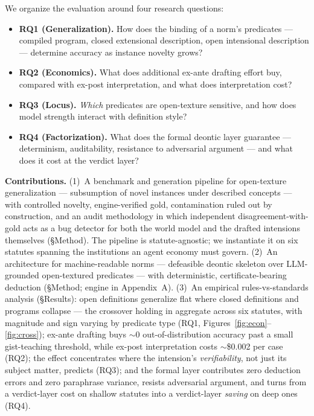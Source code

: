 We organize the evaluation around four research questions:

\begin{itemize}
\item \textbf{RQ1 (Generalization).} How does the binding of a norm's
  predicates --- compiled program, closed extensional description, open
  intensional description --- determine accuracy as instance novelty grows?
\item \textbf{RQ2 (Economics).} What does additional ex-ante drafting effort
  buy, compared with ex-post interpretation, and what does interpretation
  cost?
\item \textbf{RQ3 (Locus).} \emph{Which} predicates are open-texture
  sensitive, and how does model strength interact with definition style?
\item \textbf{RQ4 (Factorization).} What does the formal deontic layer
  guarantee --- determinism, auditability, resistance to adversarial
  argument --- and what does it cost at the verdict layer?
\end{itemize}

\noindent\textbf{Contributions.}
(1)~A benchmark and generation pipeline for open-texture generalization ---
subsumption of novel instances under described concepts --- with controlled
novelty, engine-verified gold, contamination ruled out by construction, and
an audit methodology in which independent disagreement-with-gold acts as a
bug detector for both the world model and the drafted intensions themselves
(\S Method). The pipeline is statute-agnostic; we instantiate it on six
statutes spanning the institutions an agent economy must govern.
(2)~An architecture for machine-readable norms --- defeasible deontic
skeleton over LLM-grounded open-textured predicates --- with deterministic,
certificate-bearing deduction (\S Method; engine in Appendix~A).
(3)~An empirical rules-vs-standards analysis (\S Results): open definitions
generalize flat where closed definitions and programs collapse --- the
crossover holding in aggregate across six statutes, with magnitude and sign
varying by predicate type (RQ1,
Figures~\ref{fig:econ}--\ref{fig:cross}); ex-ante
drafting buys $\sim$0 out-of-distribution accuracy past a small
gist-teaching threshold, while ex-post interpretation costs $\sim$\$0.002
per case (RQ2); the effect concentrates where the intension's
\emph{verifiability}, not just its subject matter, predicts (RQ3); and the
formal layer contributes zero deduction errors and zero paraphrase variance,
resists adversarial argument, and turns from a verdict-layer cost on shallow
statutes into a verdict-layer \emph{saving} on deep ones (RQ4).

